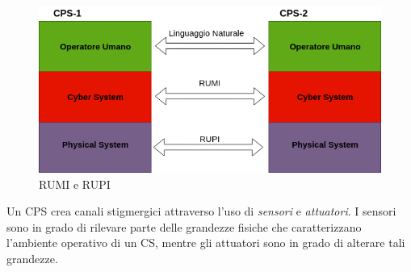 \begin{figure}[h]
	\centering
	\includegraphics[width=0.7\linewidth]{img/rupmi}
	\caption{RUMI e RUPI}
	\label{fig:rupmi}
\end{figure}
\FloatBarrier
Un CPS crea canali stigmergici attraverso l'uso di \emph{sensori} e \emph{attuatori}. I sensori sono in grado di rilevare parte delle grandezze fisiche che caratterizzano l'ambiente operativo di un CS, mentre gli attuatori sono in grado di alterare tali grandezze.